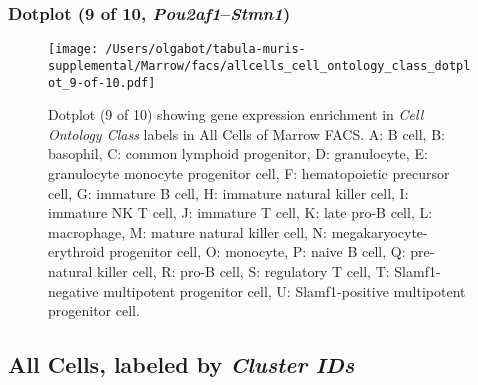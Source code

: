 \subsubsection{Dotplot (9 of 10, \emph{Pou2af1}--\emph{Stmn1})}
\begin{figure}[h]
\centering
\texttt{[image: /Users/olgabot/tabula-muris-supplemental/Marrow/facs/allcells\_cell\_ontology\_class\_dotplot\_9-of-10.pdf]}

\caption{ Dotplot (9 of 10)  showing gene expression enrichment in \emph{Cell Ontology Class} labels in All Cells of Marrow FACS. A: B cell, B: basophil, C: common lymphoid progenitor, D: granulocyte, E: granulocyte monocyte progenitor cell, F: hematopoietic precursor cell, G: immature B cell, H: immature natural killer cell, I: immature NK T cell, J: immature T cell, K: late pro-B cell, L: macrophage, M: mature natural killer cell, N: megakaryocyte-erythroid progenitor cell, O: monocyte, P: naive B cell, Q: pre-natural killer cell, R: pro-B cell, S: regulatory T cell, T: Slamf1-negative multipotent progenitor cell, U: Slamf1-positive multipotent progenitor cell.}
\end{figure}


\clearpage

\subsection{All Cells, labeled by \emph{Cluster IDs}}
